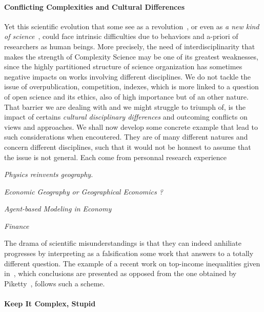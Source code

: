 \paragraph{Conflicting Complexities and Cultural Differences}

Yet this scientific evolution that some see as a revolution~\cite{colander2003complexity}, or even as \emph{a new kind of science}~\cite{wolfram2002new}, could face intrinsic difficulties due to behaviors and a-priori of researchers as human beings. More precisely, the need of interdisciplinarity that makes the strength of Complexity Science may be one of its greatest weaknesses, since the highly partitioned structure of science organization has sometimes negative impacts on works involving different disciplines. We do not tackle the issue of overpublication, competition, indexes, which is more linked to a question of open science and its ethics, also of high importance but of an other nature. That barrier we are dealing with and we might struggle to triumph of, is the impact of certains \emph{cultural disciplinary differences} and outcoming conflicts on views and approaches. We shall now develop some concrete example that lead to such considerations when encoutered. They are of many different natures and concern different disciplines, such that it would not be honnest to assume that the issue is not general. Each come from personnal research experience


\textit{Physics reinvents geography.} 



\textit{Economic Geography or Geographical Economics ?}



\textit{Agent-based Modeling in Economy}


\textit{Finance}



The drama of scientific misunderstandings is that they can indeed anhiliate progresses by interpreting as a falsification some work that answers to a totally different question. The example of a recent work on top-income inequalities given in~\cite{aghion2015innovation}, which conclusions are presented as opposed from the one obtained by Piketty~\cite{piketty2013capital}, follows such a scheme.



\paragraph{Keep It Complex, Stupid}



